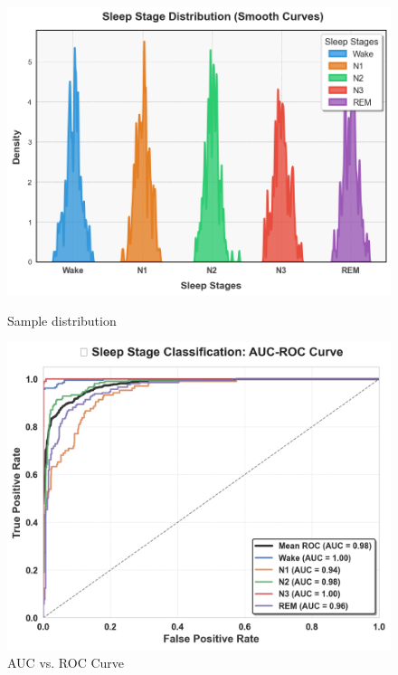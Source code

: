 \begin{figure}[htbp]
	\centering
	\begin{minipage}[b]{0.45\linewidth}
		\includegraphics[width=\linewidth]{img/paper_3/sample distribution plot pdf}
		\caption{Sample distribution}
		\label{fig:sample-distribution-plot-pdf}
	\end{minipage}
	\hfill
	\begin{minipage}[b]{0.45\linewidth}
		\includegraphics[width=\linewidth]{img/paper_3/auc vs roc curve}
		\caption{AUC vs. ROC Curve}
		\label{fig:auc-vs-roc-curve}
	\end{minipage}
\end{figure}


